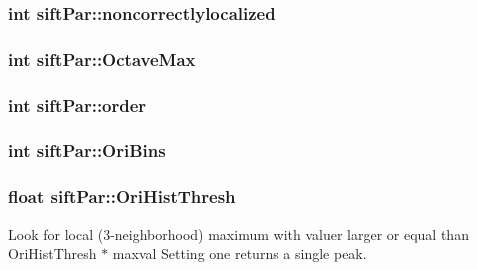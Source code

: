 \subsubsection[{noncorrectlylocalized}]{\setlength{\rightskip}{0pt plus 5cm}int sift\+Par\+::noncorrectlylocalized}\label{structsiftPar_ac2b95a0473b30122b503481b09ff2f05}
\hypertarget{structsiftPar_ad593cbf478da51b979639109bf6cce27}{}
\subsubsection[{Octave\+Max}]{\setlength{\rightskip}{0pt plus 5cm}int sift\+Par\+::\+Octave\+Max}\label{structsiftPar_ad593cbf478da51b979639109bf6cce27}
\hypertarget{structsiftPar_a6b83bbadd980b35995019d6ece94a251}{}
\subsubsection[{order}]{\setlength{\rightskip}{0pt plus 5cm}int sift\+Par\+::order}\label{structsiftPar_a6b83bbadd980b35995019d6ece94a251}
\hypertarget{structsiftPar_a374c99ffff530e66fcd859be26319848}{}
\subsubsection[{Ori\+Bins}]{\setlength{\rightskip}{0pt plus 5cm}int sift\+Par\+::\+Ori\+Bins}\label{structsiftPar_a374c99ffff530e66fcd859be26319848}
\hypertarget{structsiftPar_a3f6cf5b8f854ccb50d224e94de29891c}{}
\subsubsection[{Ori\+Hist\+Thresh}]{\setlength{\rightskip}{0pt plus 5cm}float sift\+Par\+::\+Ori\+Hist\+Thresh}\label{structsiftPar_a3f6cf5b8f854ccb50d224e94de29891c}


Look for local (3-\/neighborhood) maximum with valuer larger or equal than Ori\+Hist\+Thresh $\ast$ maxval Setting one returns a single peak. 

\hypertarget{structsiftPar_ab250ea64745ea3c2f43d2702c08b70e1}{}
